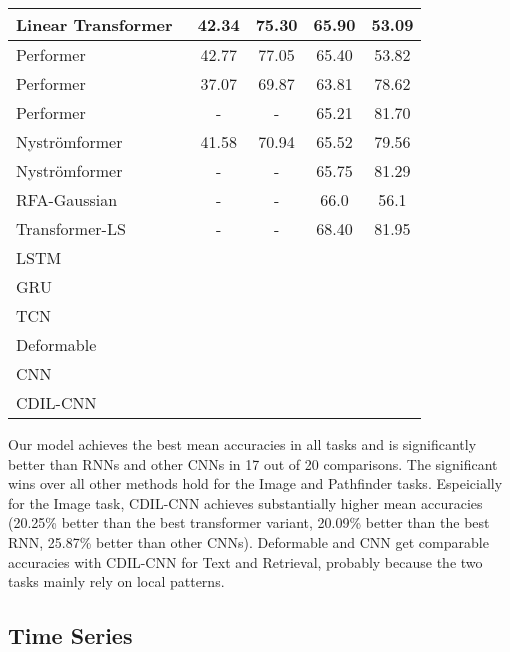\documentclass{article}
\begin{document}
\begin{table}[tb]
\begin{tabular}{lcccc}
\hline
Linear Transformer~\cite{tay2020long}    & 42.34     & 75.30    & 65.90     & 53.09      \\
\hline
Performer~\cite{tay2020long}            & 42.77     & 77.05    & 65.40     & 53.82      \\
Performer~\cite{xiong2021nystr}         & 37.07     & 69.87    & 63.81     & 78.62      \\
Performer~\cite{zhu2021long}            & -         & -        & 65.21     & 81.70     \\
\hline
Nystr\"omformer~\cite{xiong2021nystr}   & 41.58     & 70.94     & 65.52     & 79.56     \\
Nystr\"omformer~\cite{zhu2021long}     & -         & -         & 65.75     & 81.29     \\
\hline
RFA-Gaussian~\cite{peng2021random}     & -         & -         & 66.0      & 56.1     \\
\hline
Transformer-LS~\cite{zhu2021long}      & -         & -         & 68.40     & 81.95     \\
\hline
LSTM        &       &     &      &   \\
\hline
GRU         &       &      &      &   \\
\hline
TCN         &       &      &      &   \\
\hline
Deformable  &       &      &      &   \\
\hline
CNN         &       &      &      &   \\
\hline
CDIL-CNN    &   &   &   &    \\
\hline
\hline
\end{tabular}
\end{table}

Our model achieves the best mean accuracies in all tasks and is significantly better than RNNs and other CNNs in 17 out of 20 comparisons. The significant wins over all other methods hold for the Image and Pathfinder tasks. Espeicially for the Image task, CDIL-CNN achieves substantially higher mean accuracies (20.25\% better than the best transformer variant, 20.09\% better than the best RNN, 25.87\% better than other CNNs). Deformable and CNN get comparable accuracies with CDIL-CNN for Text and Retrieval, probably because the two tasks mainly rely on local patterns.


\subsection{Time Series}
\label{subsec:time}
\end{document}
